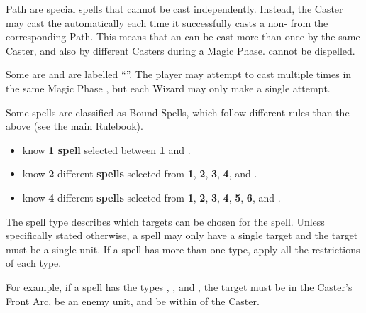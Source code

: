Path \attributespells{} are special spells that cannot be cast independently. Instead, the Caster may cast the \attributespell{} automatically each time it successfully casts a non-\attributespell{} from the corresponding Path. This means that an \attributespell{} can be cast more than once by the same Caster, and also by different Casters during a Magic Phase. \attributespells{} cannot be dispelled.

\basicsubsubtitle{\replicablespells}

Some \learnedspells{} are \replicablespells{} and are labelled \enquote{\textit{\textbf{\replicablespellnumber}}}. The player may attempt to cast \replicablespells{} multiple times in the same Magic Phase , but each Wizard may only make a single attempt.


Some spells are classified as Bound Spells, which follow different rules than the above (see the main Rulebook).


\begin{itemize}
\item \textbf{\wizardapprentices} know \textbf{1 spell} selected between \textbf{1} and \textbf{\hereditaryspellnumber}.
\item \textbf{\wizardadepts} know \textbf{2} different \textbf{spells} selected from \textbf{1}, \textbf{2}, \textbf{3}, \textbf{4}, and \textbf{\hereditaryspellnumber}.
\item \textbf{\wizardmasters} know \textbf{4} different \textbf{spells} selected from \textbf{1}, \textbf{2}, \textbf{3}, \textbf{4}, \textbf{5}, \textbf{6}, and \textbf{\hereditaryspellnumber}.
\end{itemize}


The spell type describes which targets can be chosen for the spell. Unless specifically stated otherwise, a spell may only have a single target and the target must be a single unit. If a spell has more than one type, apply all the restrictions of each type.

For example, if a spell has the types \direct{}, \hex{}, and , the target must be in the Caster's Front Arc, be an enemy unit, and be within  of the Caster.

